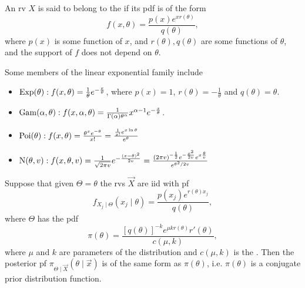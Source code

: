\documentclass[notoc,notitlepage]{tufte-book}
\begin{document}
\begin{defn}\label{defn:linear_exponential_family}
  An rv $X$ is said to belong to the  if its
  pdf is of the form
  \begin{equation*}
    f(x,\theta) = \frac{p(x)e^{xr(\theta)}}{q(\theta)},
  \end{equation*}
  where $p(x)$ is some function of $x$, and $r(\theta), q(\theta)$ are some
  functions of $\theta$, and the support of $f$ does not depend on $\theta$.
\end{defn}


\begin{eg}
  Some members of the linear exponential family include
  \begin{itemize}
    \item $\operatorname{Exp}(\theta): f(x, \theta) = \frac{1}{\theta}
      e^{-\frac{x}{\theta}}$, where $p(x) = 1$, $r(\theta) = -\frac{1}{\theta}$ 
      and $q(\theta) = \theta$.
    \item $\operatorname{Gam}(\alpha, \theta): f(x, \alpha, \theta) =
      \frac{1}{\Gamma(\alpha)\theta^\alpha} x^{\alpha - 1}
      e^{-\frac{x}{\theta}}$.
    \item $\operatorname{Poi}(\theta): f(x, \theta) = \frac{\theta^x e^{-\theta}}{x!} =
      \frac{\frac{1}{x!} e^{x \ln \theta}}{e^\theta}$
    \item $\operatorname{N}(\theta, v) : f(x, \theta, v) = \frac{1}{\sqrt{2\pi v}}
      e^{-\frac{(x-\theta)^2}{2v}} = \frac{(2\pi v)^{-\frac{1}{2}}
      e^{-\frac{x^2}{2v}} e^{x \frac{\theta}{v}}}{e^{\theta^2 / 2v}}$
  \end{itemize}
\end{eg}

\begin{thm}\label{thm:conjugate_prior_distributions_of_linear_exponential_distributions}
  Suppose that given $\Theta = \theta$ the rvs $\vec{X}$ are iid with pf
  \begin{equation*}
    f_{X_j \mid \Theta} (x_j \mid \theta) = \frac{p(x_j)e^{r(\theta)
    x_j}}{q(\theta)},
  \end{equation*}
  where $\Theta$ has the pdf
  \begin{equation*}
    \pi(\theta) = \frac{[q(\theta)]^{-k} e^{\mu kr(\theta)} r'(\theta)}{c(\mu,
    k)},
  \end{equation*}
  where $\mu$ and $k$ are parameters of the distribution and $c(\mu, k)$ is the
   . Then
  the posterior pf $\pi_{\Theta \mid \vec{X}}(\theta \mid \vec{x})$ is of the
  same form as $\pi(\theta)$, i.e. $\pi(\theta)$ is a conjugate prior
  distribution function.
\end{thm}
\end{document}
